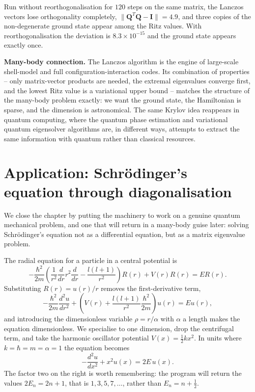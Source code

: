Run without reorthogonalisation for $120$ steps on the same matrix, the
Lanczos vectors lose orthogonality completely,
$\|\bm{Q}^{T}\bm{Q}-\bm{I}\|=4.9$, and three copies of the non-degenerate
ground state appear among the Ritz values.  With reorthogonalisation the
deviation is $8.3\times10^{-15}$ and the ground state appears exactly once.

\begin{notebox}
\textbf{Many-body connection.} The Lanczos algorithm is the engine of
large-scale shell-model and full configuration-interaction codes.  Its
combination of properties -- only matrix-vector products are needed, the
extremal eigenvalues converge first, and the lowest Ritz value is a
variational upper bound -- matches the structure of the many-body problem
exactly: we want the ground state, the Hamiltonian is sparse, and the
dimension is astronomical.  The same Krylov idea reappears in quantum
computing, where the quantum phase estimation and variational quantum
eigensolver algorithms are, in different ways, attempts to extract the same
information with quantum rather than classical resources.
\end{notebox}

\section{Application: Schr\"odinger's equation through diagonalisation}
\label{sec:schrodiag}

We close the chapter by putting the machinery to work on a genuine quantum
mechanical problem, and one that will return in a many-body guise later:
solving Schr\"odinger's equation not as a differential equation, but as a
matrix eigenvalue problem.

The radial equation for a particle in a central potential is
\begin{equation}
  -\frac{\hbar^2}{2m}\left(\frac{1}{r^2}\frac{d}{dr}r^2\frac{d}{dr}
   -\frac{l(l+1)}{r^2}\right)R(r) + V(r)R(r) = ER(r).
  \label{eq:1-radial}
\end{equation}
Substituting $R(r)=u(r)/r$ removes the first-derivative term,
\begin{equation}
  -\frac{\hbar^2}{2m}\frac{d^2u}{dr^2}
   + \left(V(r)+\frac{l(l+1)}{r^2}\frac{\hbar^2}{2m}\right)u(r) = Eu(r),
  \label{eq:1-radialu}
\end{equation}
and introducing the dimensionless variable $\rho=r/\alpha$ with $\alpha$ a
length makes the equation dimensionless.  We specialise to one dimension, drop
the centrifugal term, and take the harmonic oscillator potential
$V(x)=\tfrac{1}{2}kx^2$.  In units where $k=\hbar=m=\alpha=1$ the equation
becomes
\begin{equation}
  -\frac{d^2u}{dx^2} + x^2 u(x) = 2E\,u(x).
  \label{eq:1-hoschrod}
\end{equation}
The factor two on the right is worth remembering: the program will return the
values $2E_n=2n+1$, that is $1,3,5,7,\dots$, rather than $E_n=n+\tfrac{1}{2}$.


